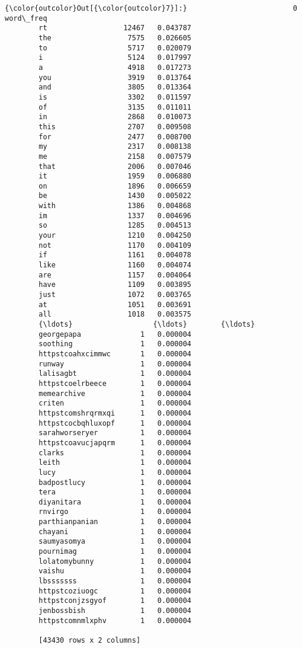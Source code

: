 \documentclass[11pt]{article}
\begin{document}
\begin{Verbatim}[commandchars=\\\{\}]
{\color{outcolor}Out[{\color{outcolor}7}]:}                         0  word\_freq
        rt                  12467   0.043787
        the                  7575   0.026605
        to                   5717   0.020079
        i                    5124   0.017997
        a                    4918   0.017273
        you                  3919   0.013764
        and                  3805   0.013364
        is                   3302   0.011597
        of                   3135   0.011011
        in                   2868   0.010073
        this                 2707   0.009508
        for                  2477   0.008700
        my                   2317   0.008138
        me                   2158   0.007579
        that                 2006   0.007046
        it                   1959   0.006880
        on                   1896   0.006659
        be                   1430   0.005022
        with                 1386   0.004868
        im                   1337   0.004696
        so                   1285   0.004513
        your                 1210   0.004250
        not                  1170   0.004109
        if                   1161   0.004078
        like                 1160   0.004074
        are                  1157   0.004064
        have                 1109   0.003895
        just                 1072   0.003765
        at                   1051   0.003691
        all                  1018   0.003575
        {\ldots}                   {\ldots}        {\ldots}
        georgepapa              1   0.000004
        soothing                1   0.000004
        httpstcoahxcimmwc       1   0.000004
        runway                  1   0.000004
        lalisagbt               1   0.000004
        httpstcoelrbeece        1   0.000004
        memearchive             1   0.000004
        criten                  1   0.000004
        httpstcomshrqrmxqi      1   0.000004
        httpstcocbqhluxopf      1   0.000004
        sarahworseryer          1   0.000004
        httpstcoavucjapqrm      1   0.000004
        clarks                  1   0.000004
        leith                   1   0.000004
        lucy                    1   0.000004
        badpostlucy             1   0.000004
        tera                    1   0.000004
        diyanitara              1   0.000004
        rnvirgo                 1   0.000004
        parthianpanian          1   0.000004
        chayani                 1   0.000004
        saumyasomya             1   0.000004
        pournimag               1   0.000004
        lolatomybunny           1   0.000004
        vaishu                  1   0.000004
        lbsssssss               1   0.000004
        httpstcoziuogc          1   0.000004
        httpstconjzsgyof        1   0.000004
        jenbossbish             1   0.000004
        httpstcomnmlxphv        1   0.000004
        
        [43430 rows x 2 columns]
\end{Verbatim}
            
\end{document}
